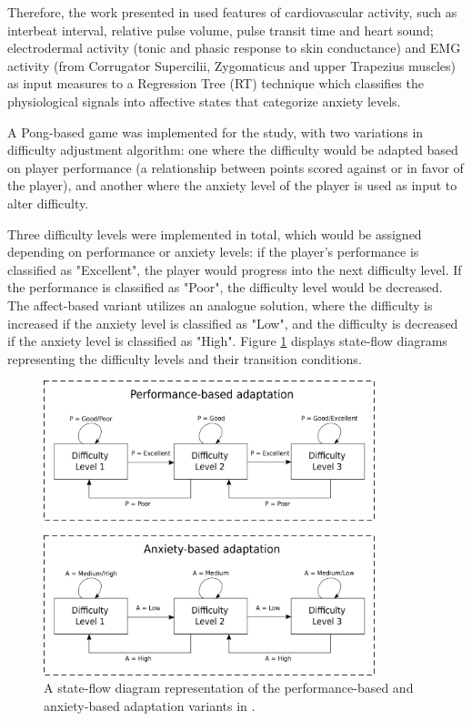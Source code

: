Therefore, the work presented in \cite{article_affectivedda} used features of cardiovascular activity, such as interbeat interval, relative pulse volume, pulse transit time and heart sound; electrodermal activity (tonic and phasic response to skin conductance) and EMG activity (from Corrugator Supercilii, Zygomaticus and upper Trapezius muscles) as input measures to a Regression Tree (RT) technique which classifies the physiological signals into affective states that categorize anxiety levels.

A Pong-based game was implemented for the study, with two variations in difficulty adjustment algorithm: one where the difficulty would be adapted based on player performance (a relationship between points scored against or in favor of the player), and another where the anxiety level of the player is used as input to alter difficulty.

Three difficulty levels were implemented in total, which would be assigned depending on performance or anxiety levels: if the player's performance is classified as "Excellent", the player would progress into the next difficulty level. If the performance is classified as "Poor", the difficulty level would be decreased. The affect-based variant utilizes an analogue solution, where the difficulty is increased if the anxiety level is classified as "Low", and the difficulty is decreased if the anxiety level is classified as "High". Figure \ref{fig:affective-adaptation} displays state-flow diagrams representing the difficulty levels and their transition conditions.

\begin{figure}[!h]
    \caption{A state-flow diagram representation of the performance-based and anxiety-based adaptation variants in \cite{article_affectivedda}.}
    \begin{center}
        \includegraphics[width=26em]{figures/fig-affective-adaptation.png}
    \end{center}
    \label{fig:affective-adaptation}
\end{figure}

